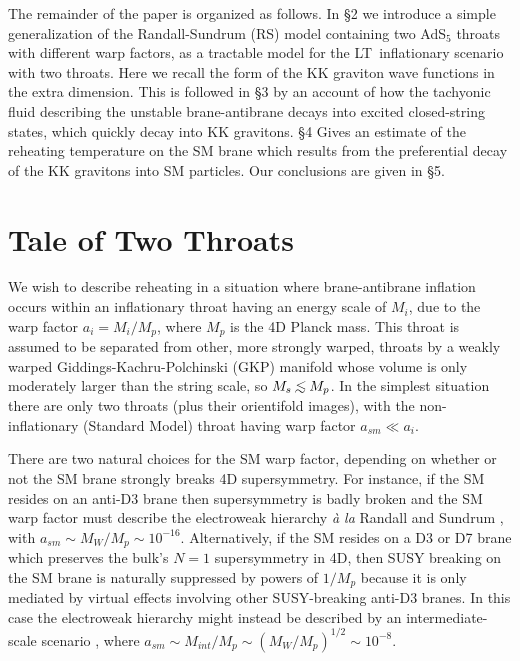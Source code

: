 \documentclass[12pt]{JHEP3}
\newcommand{\roughly}[1]{\mathrel{\raise.3ex\hbox{$#1$\kern-0.85em
\lower1ex\hbox{$\sim$}}}}
\newcommand{\lsim}{\roughly<}
\def\IK{\relax{\rm I\kern-.20em K}}
\def\IM{\relax{\rm I\kern-.15em M}}
\def\KKLMMT{{\IK L\IM T}}
\begin{document}
The remainder of the paper is organized as follows. In \S2 we
introduce a simple generalization of the Randall-Sundrum (RS)
model \cite{RS} containing two AdS$_5$ throats with different warp
factors, as a tractable model for the \KKLMMT\ inflationary
scenario \cite{kklmmt} with two throats.  Here we recall the form
of the KK graviton wave functions in the extra dimension. This is
followed in \S3 by an account of how the tachyonic fluid
describing the unstable brane-antibrane decays into excited
closed-string states, which quickly decay into KK gravitons. \S4
Gives an estimate of the reheating temperature on the SM brane
which results from the preferential decay of the KK gravitons into
SM particles. Our conclusions are given in \S5.

\section{Tale of Two Throats}

We wish to describe reheating in a situation where brane-antibrane
inflation occurs within an inflationary throat having an energy
scale of $M_i$, due to the warp factor $a_i = M_i/M_p$, where
$M_p$ is the 4D Planck mass. This throat is assumed to be
separated from other, more strongly warped, throats by a weakly
warped Giddings-Kachru-Polchinski (GKP) manifold \cite{GKP} whose
volume is only moderately larger than the string scale, so $M_s
\lsim M_p$. In the simplest situation there are only two throats
(plus their orientifold images), with the non-inflationary
(Standard Model) throat having warp factor $a_{sm} \ll a_i$.

There are two natural choices for the SM warp factor, depending on
whether or not the SM brane strongly breaks 4D supersymmetry. For
instance, if the SM resides on an anti-D3 brane then supersymmetry
is badly broken and the SM warp factor must describe the
electroweak hierarchy {\it \`a la} Randall and Sundrum \cite{RS}, with
$a_{sm} \sim M_W/M_p \sim 10^{-16}$. Alternatively, if the SM
resides on a D3 or D7 brane which preserves the bulk's $N=1$
supersymmetry in 4D, then SUSY breaking on the SM brane is
naturally suppressed by powers of $1/M_p$ because it is only
mediated by virtual effects involving other SUSY-breaking anti-D3
branes. In this case the electroweak hierarchy might instead be
described by an intermediate-scale scenario \cite{IntScale}, where
$a_{sm} \sim M_{int}/M_p \sim (M_W/M_p)^{1/2} \sim 10^{-8}$.
\end{document}
